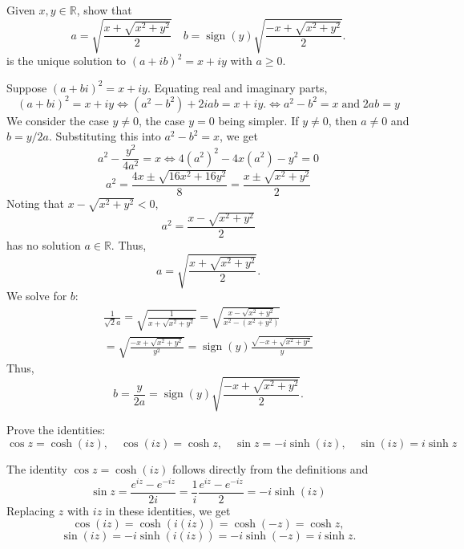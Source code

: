 \documentclass[12pt]{exam}
\newcommand{\RR}{\mathbb{R}}
\DeclareMathOperator{\sign}{sign}
\begin{document}
\begin{questions}
    \question\label{Q:sqrt}
    Given $x,y\in\RR$, show that 
    \begin{equation*}
        a=\sqrt{\frac{x+\sqrt{x^2+y^2}}2}\quad
        b=\sign(y)\sqrt{\frac{-x+\sqrt{x^2+y^2}}2}.
    \end{equation*}
    is the unique solution to $(a+ib)^2=x+iy$ with $a\geq 0$.
    \begin{solution}
        Suppose $(a+bi)^2 = x+iy$. Equating real and imaginary parts,
        \[
            (a+bi)^2 = x+iy\Longleftrightarrow (a^2-b^2) + 2iab = x + iy.
            \Longleftrightarrow a^2-b^2=x\;\text{and}\;2ab=y
        \]
        We consider the case $y\neq 0$, the case $y=0$ being simpler. If $y\neq 0$, then $a\neq 0$ and $b=y/2a$. Substituting this into $a^2-b^2=x$, we get
        \[
            a^2 - \frac{y^2}{4a^2} = x\Longleftrightarrow 4(a^2)^2 - 4x(a^2) - y^2=0
        \]
        \[
            a^2 = \frac{4x\pm \sqrt{16x^2 + 16y^2}}{8} = \frac{x\pm \sqrt{x^2 + y^2}}{2}
        \]
        Noting that $x-\sqrt{x^2+y^2}<0$,
        \[
            a^2=\frac{x-\sqrt{x^2+y^2}}2
        \]
        has no solution $a\in\RR$. Thus,
        \[
            a = \sqrt{\frac{x+\sqrt{x^2+y^2}}2}.
        \]
        We solve for $b$:
        \begin{multline*}
            \frac1{\sqrt2a} = \sqrt{\frac1{x+\sqrt{x^2+y^2}}} = \sqrt{\frac{x - \sqrt{x^2+y^2}}{x^2 - (x^2+y^2)}}\\ = \sqrt{\frac{-x+\sqrt{x^2+y^2}}{y^2}}
            =\sign(y)\frac{\sqrt{-x+\sqrt{x^2+y^2}}}{y}
        \end{multline*}
        Thus,
        \[
    b = \frac{y}{2a} = \sign(y)\sqrt{\frac{-x+\sqrt{x^2+y^2}}{2}}.
        \]
    \end{solution}



    \question Prove the identities:
    \[
        \cos z = \cosh(iz),\quad \cos(iz) = \cosh z,\quad
        \sin z = -i\sinh(iz),\quad \sin(iz) = i\sinh z
    \]
    \begin{solution}
        The identity $\cos z=\cosh(iz)$ follows directly from the definitions and
        \[
            \sin z = \frac{e^{iz} - e^{-iz}}{2i} = \frac1i\frac{e^{iz} - e^{-iz}}{2} = -i\sinh(iz)
        \]
        Replacing $z$ with $iz$ in these identities, we get
        \[
            \cos(iz) = \cosh(i(iz)) = \cosh(-z) = \cosh z,
        \]
        \[
            \sin(iz) = -i\sinh(i(iz)) = -i\sinh(-z) = i\sinh z.
        \]
    \end{solution}




\end{questions}
\end{document}
